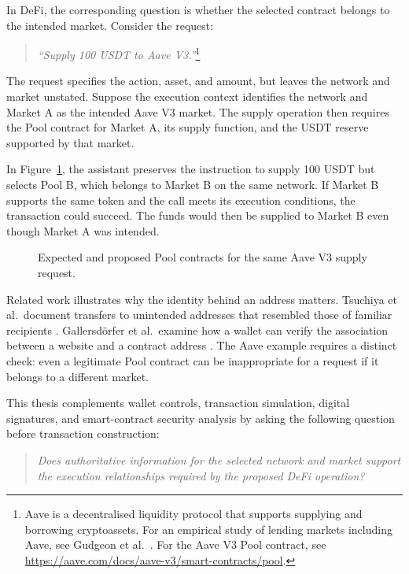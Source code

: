 In DeFi, the corresponding question is whether the selected contract
belongs to the intended market. Consider the request:

\begin{quote}
\textit{``Supply 100 USDT to Aave V3.''}\footnote{Aave is a
decentralised liquidity protocol that supports supplying and borrowing
cryptoassets. For an empirical study of lending markets including Aave,
see Gudgeon et al.~\cite{gudgeonLoanableFunds2020}. For the Aave V3 Pool
contract, see \url{https://aave.com/docs/aave-v3/smart-contracts/pool}.}
\end{quote}

The request specifies the action, asset, and amount, but leaves the
network and market unstated. Suppose the execution context identifies
the network and Market A as the intended Aave V3 market. The supply
operation then requires the Pool contract for Market A, its supply
function, and the USDT reserve supported by that market.

In Figure~\ref{fig:aave_supply_comparison}, the assistant preserves
the instruction to supply 100 USDT but selects Pool B, which belongs
to Market B on the same network. If Market B supports the same token
and the call meets its execution conditions, the transaction could
succeed. The funds would then be supplied to Market B even though
Market A was intended.

\begin{figure}[htbp]
    \centering
    
    \caption{Expected and proposed Pool contracts for the same Aave V3
    supply request.}
    \label{fig:aave_supply_comparison}
\end{figure}

Related work illustrates why the identity behind an address matters.
Tsuchiya et al.\ document transfers to unintended addresses that
resembled those of familiar recipients
\cite{tsuchiyaAddressPoisoning2025}. Gallersd\"orfer et al.\ examine
how a wallet can verify the association between a website and a
contract address \cite{gallersdorferMetaMaskTLS2022}. The Aave example
requires a distinct check: even a legitimate Pool contract can be
inappropriate for a request if it belongs to a different market.

This thesis complements wallet controls, transaction simulation,
digital signatures, and smart-contract security analysis by asking
the following question before transaction construction:

\begin{quote}
\textit{Does authoritative information for the selected network and
market support the execution relationships required by the proposed
DeFi operation?}
\end{quote}

